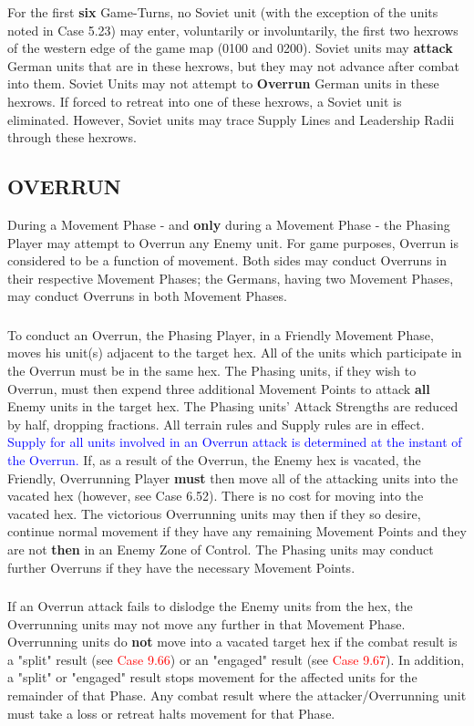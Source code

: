 For the first \textbf{six} Game-Turns, no Soviet unit (with the exception of the units noted in Case 5.23) may enter, voluntarily or involuntarily, the first two hexrows of the western edge of the game map (0100 and 0200). Soviet units may \textbf{attack} German units that are in these hexrows, but they may not advance after combat into them. Soviet Units may not attempt to \textbf{Overrun} German units in these hexrows. If forced to retreat into one of these hexrows, a Soviet unit is eliminated. However, Soviet units may trace Supply Lines and Leadership Radii through these hexrows.

\subsection{OVERRUN}

During a Movement Phase - and \textbf{only} during a Movement Phase - the Phasing Player may attempt to Overrun any Enemy unit. For game purposes, Overrun is considered to be a function of movement. Both sides may conduct Overruns in their respective Movement Phases; the Germans, having two Movement Phases, may conduct Overruns in both Movement Phases.

\subsubsection{} To conduct an Overrun, the Phasing Player, in a Friendly Movement Phase, moves his unit(s) adjacent to the target hex. All of the units which participate in the Overrun must be in the same hex. The Phasing units, if they wish to Overrun, must then expend three additional Movement Points to attack \textbf{all} Enemy units in the target hex. The Phasing units' Attack Strengths are reduced by half, dropping fractions. All terrain rules and Supply rules are in effect. \textcolor{blue}{Supply for all units involved in an Overrun attack is determined at the instant of the Overrun.} If, as a result of the Overrun, the Enemy hex is vacated, the Friendly, Overrunning Player \textbf{must} then move all of the attacking units into the vacated hex (however, see Case 6.52). There is no cost for moving into the vacated hex. The victorious Overrunning units may then if they so desire, continue normal movement if they have any remaining Movement Points and they are not \textbf{then} in an Enemy Zone of Control. The Phasing units may conduct further Overruns if they have the necessary Movement Points.

\subsubsection{} If an Overrun attack fails to dislodge the Enemy units from the hex, the Overrunning units may not move any further in that Movement Phase. Overrunning units do \textbf{not} move into a vacated target hex if the combat result is a "split" result (see \textcolor{red}{Case 9.66}) or an "engaged" result (see \textcolor{red}{Case 9.67}). In addition, a "split" or "engaged" result stops movement for the affected units for the remainder of that Phase. Any combat result where the attacker/Overrunning unit must take a loss or retreat halts movement for that Phase.

